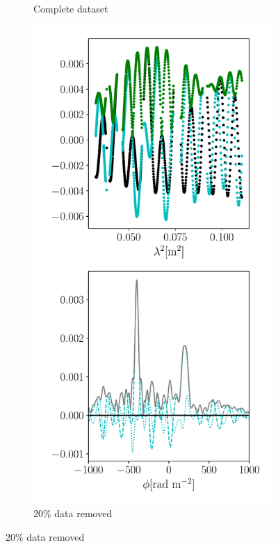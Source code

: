 \documentclass[xetex,aspectratio=169]{beamer}
\begin{document}
\begin{frame}
\begin{figure}
\begin{subfigure}{0.2\textwidth}
			\caption{Complete dataset}
		\end{subfigure}
		\begin{subfigure}{0.2\textwidth}
			\includegraphics[width=\textwidth]{figures/dataset_features/data_removed.pdf}
			\caption{20\% data removed}

\end{subfigure}
\end{figure}
\end{frame}
\end{document}
